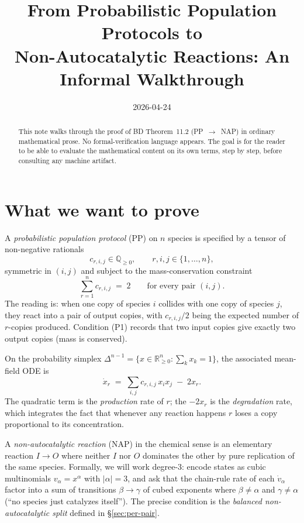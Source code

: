 \documentclass[11pt]{article}
\title{From Probabilistic Population Protocols to \\
Non-Autocatalytic Reactions: An Informal Walkthrough}
\author{}
\date{2026-04-24}
\newcommand{\R}{\mathbb{R}}
\newcommand{\Q}{\mathbb{Q}}
\begin{document}
\maketitle

\begin{abstract}
This note walks through the proof of BD Theorem~11.2 (PP~$\to$~NAP) in
ordinary mathematical prose. No formal-verification language appears.
The goal is for the reader to be able to evaluate the mathematical
content on its own terms, step by step, before consulting any machine
artifact.
\end{abstract}

\section{What we want to prove}

A \emph{probabilistic population protocol} (PP) on $n$ species is
specified by a tensor of non-negative rationals
\[
   c_{r,i,j} \in \Q_{\ge 0}, \qquad r,i,j \in \{1,\dots,n\},
\]
symmetric in $(i,j)$ and subject to the mass-conservation constraint
\begin{equation}
   \sum_{r=1}^n c_{r,i,j} \;=\; 2 \qquad \text{for every pair } (i,j).
   \tag{P1}
\end{equation}
The reading is: when one copy of species $i$ collides with one copy of
species $j$, they react into a pair of output copies, with $c_{r,i,j}/2$
being the expected number of $r$-copies produced. Condition (P1) records
that two input copies give exactly two output copies (mass is conserved).

On the probability simplex $\Delta^{n-1} = \{x \in \R_{\ge 0}^n : \sum_k x_k = 1\}$,
the associated mean-field ODE is
\begin{equation}
   \dot x_r \;=\; \sum_{i,j} c_{r,i,j}\, x_i x_j \;-\; 2 x_r.
   \tag{P2}
\end{equation}
The quadratic term is the \emph{production} rate of $r$; the $-2x_r$ is the
\emph{degradation} rate, which integrates the fact that whenever any
reaction happens $r$ loses a copy proportional to its concentration.

A \emph{non-autocatalytic reaction} (NAP) in the chemical sense is an
elementary reaction $I \to O$ where neither $I$ nor $O$ dominates the
other by pure replication of the same species. Formally, we will work
degree-$3$: encode states as cubic multinomials $v_\alpha = x^\alpha$ with
$|\alpha| = 3$, and ask that the chain-rule rate of each $\dot v_\alpha$
factor into a sum of transitions $\beta \to \gamma$ of cubed exponents
where $\beta \ne \alpha$ and $\gamma \ne \alpha$ (``no species just
catalyzes itself''). The precise condition is the \emph{balanced
non-autocatalytic split} defined in \S\ref{sec:per-pair}.
\end{document}
